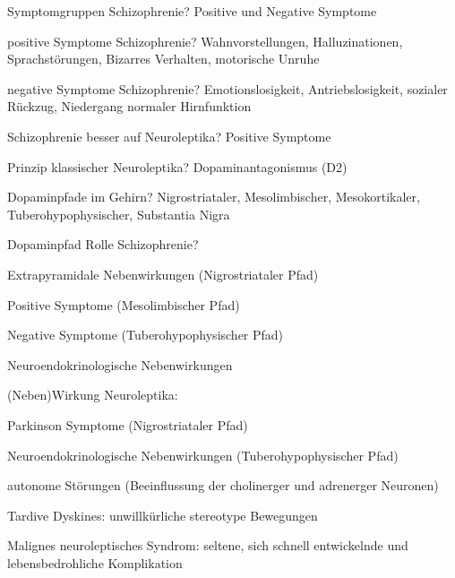 \documentclass[a4paper]{article}
\begin{document}
\begin{multicols}{3}
  Symptomgruppen Schizophrenie? Positive und Negative Symptome

  positive Symptome Schizophrenie? Wahnvorstellungen, Halluzinationen, Sprachstörungen, Bizarres Verhalten, motorische Unruhe

  negative Symptome Schizophrenie?  Emotionslosigkeit, Antriebslosigkeit, sozialer Rückzug, Niedergang normaler Hirnfunktion

  Schizophrenie besser auf Neuroleptika? Positive Symptome

  Prinzip klassischer Neuroleptika? Dopaminantagonismus (D2)

  Dopaminpfade im Gehirn? Nigrostriataler, Mesolimbischer, Mesokortikaler, Tuberohypophysischer, Substantia Nigra

  Dopaminpfad Rolle Schizophrenie?
  \begin{itemize*}
    \item Extrapyramidale Nebenwirkungen (Nigrostriataler Pfad)
    \item Positive Symptome (Mesolimbischer Pfad)
    \item Negative Symptome (Tuberohypophysischer Pfad)
    \item Neuroendokrinologische Nebenwirkungen
  \end{itemize*}

  (Neben)Wirkung Neuroleptika:
  \begin{itemize*}
    \item Parkinson Symptome (Nigrostriataler Pfad)
    \item Neuroendokrinologische Nebenwirkungen (Tuberohypophysischer Pfad)
    \item autonome Störungen (Beeinflussung der cholinerger und adrenerger Neuronen)
    \item Tardive Dyskines: unwillkürliche stereotype Bewegungen
    \item Malignes neuroleptisches Syndrom: seltene, sich schnell entwickelnde und lebensbedrohliche Komplikation
  \end{itemize*}

\end{multicols}
\end{document}
